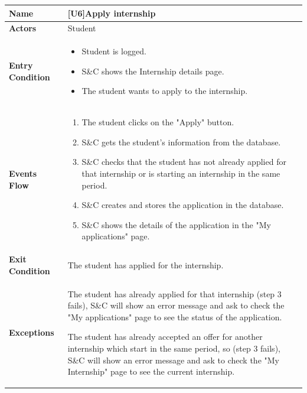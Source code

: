 \begin{center}
    \begin{tabular}{|p{9em}|p{27em}|}
        \hline
        \rowcolor{bluepoli!40}
        \textbf{Name} & \textbf{[U6]Apply internship} \\
        \hline
        \textbf{Actors} & Student \\
        \hline
        \textbf{Entry Condition} & 
        \begin{itemize}
            \item Student is logged.
            \item S\&C shows the Internship details page.
            \item The student wants to apply to the internship.
        \end{itemize} \\
        \hline
        \textbf{Events Flow} & 
        \begin{enumerate}
            \item The student clicks on the "Apply" button.
            \item S\&C gets the student's information from the database.
            \item S\&C checks that the student has not already applied for that internship or is starting an internship in the same period.
            \item S\&C creates and stores the application in the database.
            \item S\&C shows the details of the application in the "My applications" page.
        \end{enumerate} \\
        \hline
        \textbf{Exit Condition} & The student has applied for the internship. \\
        \hline
        \textbf{Exceptions} & The student has already applied for that internship (step 3 fails), S\&C will show an error message and ask to
        check the "My applications" page to see the status of the application. 
        
        The student has already accepted an offer for another internship which start in the same period, so (step 3 fails), S\&C will show an 
        error message and ask to check the "My Internship" page to see the current internship.\\
        \hline
    \end{tabular}
\end{center}

